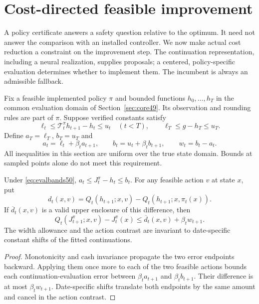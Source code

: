 \section{Cost-directed feasible improvement}\label{sec:improvement50}
A policy certificate answers a safety question relative to the optimum. It need not answer the comparison with an installed controller. We now make actual cost reduction a constraint on the improvement step. The continuation representation, including a neural realization, supplies proposals; a centered, policy-specific evaluation determines whether to implement them. The incumbent is always an admissible fallback.

Fix a feasible implemented policy $\pi$ and bounded functions $h_0,\ldots,h_T$ in the common evaluation domain of Section~\ref{sec:core49}. Its observation and rounding rules are part of $\pi$. Suppose verified constants satisfy
\begin{equation}\label{eq:evalbands50}
 \ell_t\le \mathcal T_t^\pi h_{t+1}-h_t\le u_t\quad(t<T),
 \qquad \ell_T\le g-h_T\le u_T.
\end{equation}
Define $a_T=\ell_T$, $b_T=u_T$ and
\[
 a_t=\ell_t+\beta_t a_{t+1},\qquad
 b_t=u_t+\beta_t b_{t+1},\qquad w_t=b_t-a_t.
\]
All inequalities in this section are uniform over the true state domain. Bounds at sampled points alone do not meet this requirement.

\begin{proposition}\label{prop:advantage50}
Under \eqref{eq:evalbands50}, $a_t\le J_t^\pi-h_t\le b_t$. For any feasible action $v$ at state $x$, put
\[
 d_t(x,v)=Q_t(h_{t+1};x,v)-Q_t(h_{t+1};x,\pi_t(x)).
\]
If $\overline d_t(x,v)$ is a valid upper enclosure of this difference, then
\begin{equation}\label{eq:advantage50}
 Q_t(J_{t+1}^\pi;x,v)-J_t^\pi(x)
 \le \overline d_t(x,v)+\beta_t w_{t+1}.
\end{equation}
The width allowance and the action contrast are invariant to date-specific constant shifts of the fitted continuations.
\end{proposition}
\begin{proof}
Monotonicity and cash invariance propagate the two error endpoints backward. Applying them once more to each of the two feasible actions bounds each continuation-evaluation error between $\beta_ta_{t+1}$ and $\beta_tb_{t+1}$. Their difference is at most $\beta_tw_{t+1}$. Date-specific shifts translate both endpoints by the same amount and cancel in the action contrast.\end{proof}

